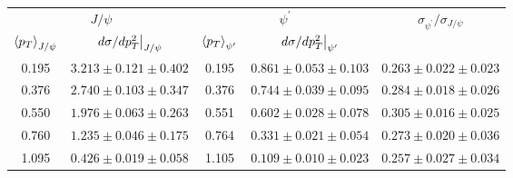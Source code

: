 \begin{tabular}{cc|cc|c}
\hline
\multicolumn{2}{c|}{$J/\psi$} &
  \multicolumn{2}{c|}{$\psi^{\prime}$} &
  \multirow{2}{*}{$\sigma_{\psi^\prime}/\sigma_{J/\psi}$} \\ \cline{1-4}
$\expval{p_T}_{J/\psi}$ &
  $\eval{d\sigma/dp_T^2}_{J/\psi}$ &
  $\expval{p_T}_{\psi^\prime}$ &
  $\eval{d\sigma/dp_T^2}_{\psi^\prime}$ &
   \\ \hline
\multicolumn{1}{c|}{0.195} &
  $3.213\pm0.121\pm0.402$ &
  \multicolumn{1}{c|}{0.195} &
  $0.861\pm0.053\pm0.103$ &
  $0.263\pm0.022\pm0.023$ \\
\multicolumn{1}{c|}{0.376} &
  $2.740\pm0.103\pm0.347$ &
  \multicolumn{1}{c|}{0.376} &
  $0.744\pm0.039\pm0.095$ &
  $0.284\pm0.018\pm0.026$ \\
\multicolumn{1}{c|}{0.550} &
  $1.976\pm0.063\pm0.263$ &
  \multicolumn{1}{c|}{0.551} &
  $0.602\pm0.028\pm0.078$ &
  $0.305\pm0.016\pm0.025$ \\
\multicolumn{1}{c|}{0.760} &
  $1.235\pm0.046\pm0.175$ &
  \multicolumn{1}{c|}{0.764} &
  $0.331\pm0.021\pm0.054$ &
  $0.273\pm0.020\pm0.036$ \\
\multicolumn{1}{c|}{1.095} &
  $0.426\pm0.019\pm0.058$ &
  \multicolumn{1}{c|}{1.105} &
  $0.109\pm0.010\pm0.023$ &
  $0.257\pm0.027\pm0.034$ \\ \hline
\end{tabular}

